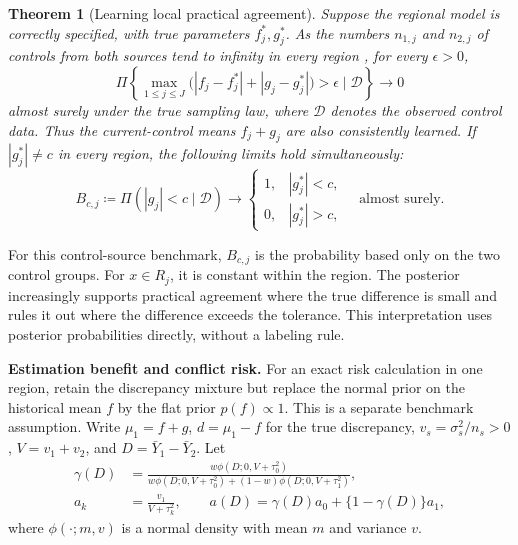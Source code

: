 \documentclass[11pt]{article}
\newtheorem{theorem}{Theorem}
\theoremstyle{remark}\newtheorem{remark}{Remark}[section]
\providecommand{\DIFaddtex}[1]{{\protect\color{blue} \sf #1}} %
\providecommand{\DIFaddbegin}{} %
\providecommand{\DIFaddend}{} %
\providecommand{\DIFadd}[1]{\texorpdfstring{\DIFaddtex{#1}}{#1}} %
\begin{document}
\begin{theorem}[Learning local practical agreement]\label{thm:regional_learning}
\DIFadd{Suppose the regional model is correctly specified, with true parameters $f_j^*,g_j^*$. As the numbers $n_{1,j}$ and $n_{2,j}$ of controls from both sources tend }\DIFaddend to infinity in every region \DIFaddbegin \DIFadd{, for every $\epsilon>0$,
}\[
\Pi\left\{\max_{1\leq j\leq J}
\bigl(|f_j-f_j^*|+|g_j-g_j^*|\bigr)>\epsilon\mid\mathcal D\right\}\longrightarrow0
\]
\DIFadd{almost surely under the true sampling law, where $\mathcal D$ denotes the observed control data. Thus the current-control means $f_j+g_j$ are also consistently learned. If $|g_j^*|\ne c$ in every region, the following limits hold simultaneously:
}\begin{equation}\label{eq:regional_agreement}
B_{c,j}\coloneqq\Pi(|g_j|<c\mid\mathcal D)
\longrightarrow
\begin{cases}
1,& |g_j^*|<c,\\
0,& |g_j^*|>c,
\end{cases}
\quad\text{almost surely}.
\end{equation}
\end{theorem}
\DIFadd{For this control-source benchmark, $B_{c,j}$ is the probability based only on the two control groups. For $x\in R_j$, it is constant within the region. The posterior increasingly supports practical agreement where the true difference is small and rules it out where the difference exceeds the tolerance. This interpretation uses posterior probabilities directly, without a labeling rule.
}\DIFaddend 

 \DIFaddbegin \noindent\DIFadd{\textbf{Estimation benefit and conflict risk.}
For an exact risk calculation }\DIFaddend in one region,  \DIFaddbegin \DIFadd{retain the discrepancy mixture but replace the normal prior on the historical mean $f$ by the flat prior $p(f)\propto1$. This is a separate benchmark assumption. Write $\mu_1=f+g$, $d=\mu_1-f$ for the true discrepancy, $v_s=\sigma_s^2/n_s>0$, $V=v_1+v_2$, and $D=\bar Y_1-\bar Y_2$. Let
}\begin{equation}\label{eq:regional_weight}
\begin{aligned}
\gamma(D)&=\frac{w\phi(D;0,V+\tau_0^2)}{w\phi(D;0,V+\tau_0^2)+(1-w)\phi(D;0,V+\tau_1^2)},\\
a_k&=\frac{v_1}{V+\tau_k^2},\qquad
a(D)=\gamma(D)a_0+\{1-\gamma(D)\}a_1,
\end{aligned}
\end{equation}
\DIFadd{where $\phi(\cdot;m,v)$ is a normal density with mean $m$ and variance $v$.
}
\end{document}
